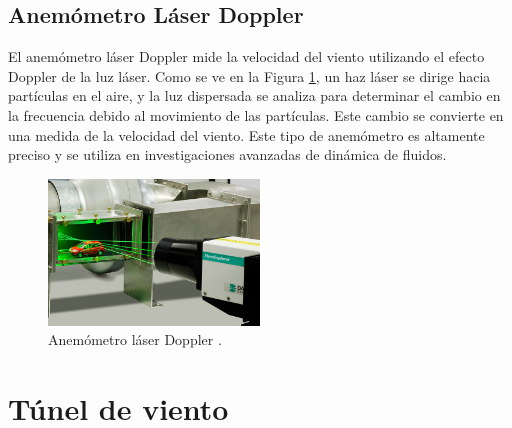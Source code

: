 \subsection*{Anemómetro Láser Doppler}

El anemómetro láser Doppler mide la velocidad del viento utilizando el efecto Doppler de la luz láser. Como se ve en la Figura \ref{fig:laserDoppler}, un haz láser se dirige hacia partículas en el aire, y la luz dispersada se analiza para determinar el cambio en la frecuencia debido al movimiento de las partículas. Este cambio se convierte en una medida de la velocidad del viento. Este tipo de anemómetro es altamente preciso y se utiliza en investigaciones avanzadas de dinámica de fluidos.

\begin{figure}[h]
    \centering
    \includegraphics[width=0.5\textwidth]{Figuras/viento/sensores/laserDoppler.png}
    \caption{Anemómetro láser Doppler \cite{dantecLDA2024}.}
    \label{fig:laserDoppler}
\end{figure}




\section{Túnel de viento}\label{tunelDeViento}

